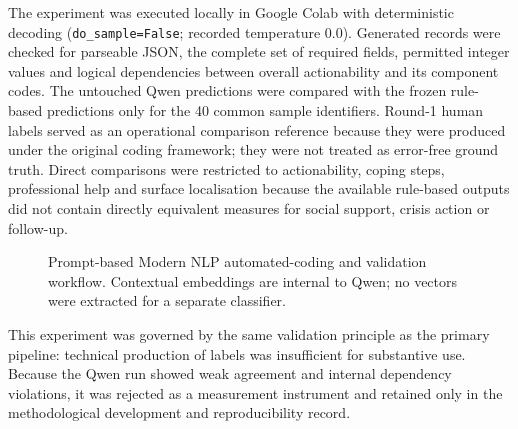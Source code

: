 The experiment was executed locally in Google Colab with deterministic decoding (\texttt{do\_sample=False}; recorded temperature 0.0). Generated records were checked for parseable JSON, the complete set of required fields, permitted integer values and logical dependencies between overall actionability and its component codes. The untouched Qwen predictions were compared with the frozen rule-based predictions only for the 40 common sample identifiers. Round-1 human labels served as an operational comparison reference because they were produced under the original coding framework; they were not treated as error-free ground truth. Direct comparisons were restricted to actionability, coping steps, professional help and surface localisation because the available rule-based outputs did not contain directly equivalent measures for social support, crisis action or follow-up.

\begin{figure}[H]
\centering
{}
\caption{Prompt-based Modern NLP automated-coding and validation workflow. Contextual embeddings are internal to Qwen; no vectors were extracted for a separate classifier.}
\label{fig:qwen_pipeline}
\end{figure}

This experiment was governed by the same validation principle as the primary pipeline: technical production of labels was insufficient for substantive use. Because the Qwen run showed weak agreement and internal dependency violations, it was rejected as a measurement instrument and retained only in the methodological development and reproducibility record.

